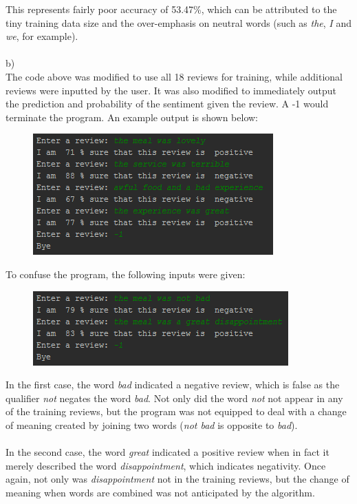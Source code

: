 \documentclass[10pt]{article}
\begin{document}
This represents fairly poor accuracy of 53.47\%, which can be attributed to the tiny training data size and the over-emphasis on neutral words (such as \textit{the}, \textit{I} and \textit{we}, for example).\\
\\
b)\\
The code above was modified to use all 18 reviews for training, while additional reviews were inputted by the user. It was also modified to immediately output the prediction and probability of the sentiment given the review. A -1 would terminate the program. An example output is shown below:
\begin{figure}[H]
\includegraphics[scale=1]{RestaurantUserInputExample.png}
\end{figure}
\newpage
To confuse the program, the following inputs were given:
\begin{figure}[H]
\includegraphics[scale=1]{RestaurantUserInputConfuseExample.png}
\end{figure}
In the first case, the word \textit{bad} indicated a negative review, which is false as the qualifier \textit{not} negates the word \textit{bad}. Not only did the word \textit{not} not appear in any of the training reviews, but the program was not equipped to deal with a change of meaning created by joining two words (\textit{not bad} is opposite to \textit{bad}).\\
\\
In the second case, the word \textit{great} indicated a positive review when in fact it merely described the word \textit{disappointment}, which indicates negativity. Once again, not only was \textit{disappointment} not in the training reviews, but the change of meaning when words are combined was not anticipated by the algorithm.\\
\end{document}
